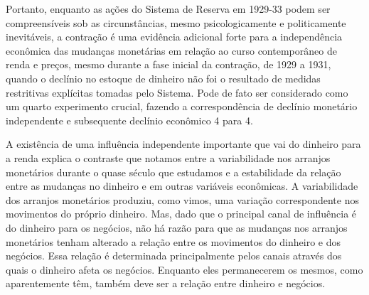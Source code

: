 \documentclass[12pt]{article}
\begin{document}
Portanto, enquanto as ações do Sistema de Reserva em 1929-33 podem ser compreensíveis sob as circunstâncias, mesmo psicologicamente e politicamente inevitáveis, a contração é uma evidência adicional forte para a independência econômica das mudanças monetárias em relação ao curso contemporâneo de renda e preços, mesmo durante a fase inicial da contração, de 1929 a 1931, quando o declínio no estoque de dinheiro não foi o resultado de medidas restritivas explícitas tomadas pelo Sistema. Pode de fato ser considerado como um quarto experimento crucial, fazendo a correspondência de declínio monetário independente e subsequente declínio econômico 4 para 4.

A existência de uma influência independente importante que vai do dinheiro para a renda explica o contraste que notamos entre a variabilidade nos arranjos monetários durante o quase século que estudamos e a estabilidade da relação entre as mudanças no dinheiro e em outras variáveis econômicas. A variabilidade dos arranjos monetários produziu, como vimos, uma variação correspondente nos movimentos do próprio dinheiro. Mas, dado que o principal canal de influência é do dinheiro para os negócios, não há razão para que as mudanças nos arranjos monetários tenham alterado a relação entre os movimentos do dinheiro e dos negócios. Essa relação é determinada principalmente pelos canais através dos quais o dinheiro afeta os negócios. Enquanto eles permanecerem os mesmos, como aparentemente têm, também deve ser a relação entre dinheiro e negócios.
\end{document}
